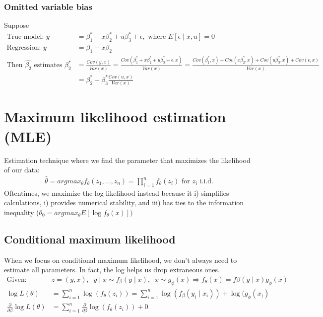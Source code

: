 \documentclass{article}
\begin{document}
\subsubsection{Omitted variable bias}
Suppose 
\begin{align*}
  \textrm{True model: } y &= \beta_1^* + x\beta_2^* + u\beta_3^* + \epsilon, \textrm{ where } E[\epsilon \mid x, u] = 0\\
  \textrm{Regression: } y &= \beta_1 + x\beta_2\\
  \textrm{Then } \hat{\beta_2} \textrm{ estimates } \beta_2^* &= \frac{Cov(y, x)}{Var(x)} = \frac{Cov(\beta_1^* + x\beta_2^* + u\beta_3^* + \epsilon, x)}{Var(x)} = \frac{Cov(\beta_1^*, x) + Cov(x\beta_2^*,x) + Cov(u\beta_3^*, x) + Cov(\epsilon, x)}{Var(x)}\\
  &= \beta_2^* + \beta_3^* \frac{Cov(u,x)}{Var(x)}
\end{align*}


\section{Maximum likelihood estimation (MLE)}
Estimation technique where we find the parameter that maximizes the likelihood of our data: 
\begin{align*}
  \hat{\theta} = argmax_\theta f_\theta(z_1, \dots, z_n) = \prod_{i=1}^n f_\theta(z_i) \textrm{ for $z_i$ i.i.d.}
\end{align*} 
Oftentimes, we maximize the log-likelihood instead because it i) simplifies calculations, i) provides numerical stability, and iii) has ties to the information inequality ($\theta_0 = argmax_\theta E[\log f_\theta(x)])$

\subsection{Conditional maximum likelihood}
When we focus on conditional maximum likelihood, we don't always need to estimate all parameters. In fact, the log helps us drop extraneous ones.
\begin{align*}
  \textrm{Given: }& z=(y,x), \;\; y\mid x \sim f_\beta(y\mid x), \;\; x \sim g_\phi(x) \Longrightarrow f_\theta(x) = f\beta(y\mid x) g_\phi(x)\\
  \log L(\theta) &= \sum_{i=1}^n \log(f_\theta(z_i)) = \sum_{i=1}^n \log(f_\beta(y_i\mid x_i)) + \log(g_\phi(x_))\\
  \frac{\partial}{\partial \beta} \log L(\theta) &= \sum_{i=1}^n \frac{\partial}{\partial \beta}\log(f_\theta(z_i)) + 0
\end{align*}
\end{document}
